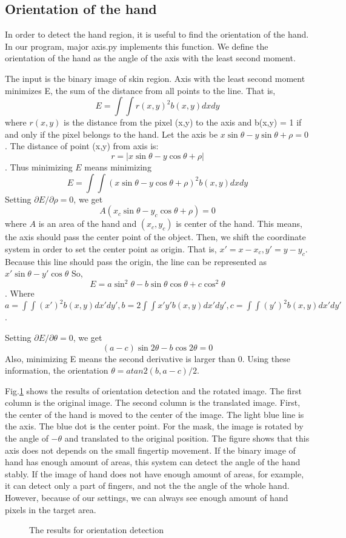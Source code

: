 \subsection{Orientation of the hand}
In order to detect the hand region, it is useful to find the orientation of the hand.
In our program, major axis.py implements this function.
We define the orientation of the hand as the angle of the axis with the least second moment.\par
The input is the binary image of skin region.
Axis with the least second moment minimizes E, the sum of the distance from all points to the line. That is,
$$E = \int \int r(x,y)^2 b(x,y) dxdy$$
where $r(x,y)$ is the distance from the pixel (x,y) to the axis and b(x,y) = 1 if and only if the pixel belongs to the hand.
Let the axis be $x\sin{\theta} - y\sin{\theta} + \rho = 0$.
The distance of point (x,y) from axis is:
$$r = |x\sin{\theta}-y\cos{\theta}+\rho|$$.
Thus minimizing $E$ means minimizing
$$E = \int\int (x\sin{\theta}-y\cos{\theta}+\rho)^2 b(x,y)dxdy$$
Setting $\partial E / \partial \rho = 0$, we get
$$A(x_c \sin{\theta} - y_c \cos{\theta} + \rho) = 0$$
where $A$ is an area of the hand and $(x_c,y_c)$ is center of the hand.
This means, the axis should pass the center point of the object.
Then, we shift the coordinate system in order to set the center point as origin.
That is, 
$x'= x - x_c, y' = y - y_c$.
Because this line should pass the origin, the line can be represented as
$x'\sin{\theta}-y'\cos{\theta}$
So, $$E = a \sin^2{\theta} - b\sin{\theta}\cos{\theta} + c\cos^2{\theta}$$.
Where $a = \int\int (x')^2 b(x,y) dx'dy', b = 2\int\int x'y' b(x,y) dx'dy', 
c = \int\int (y')^2 b(x,y)dx'dy'$.\par
Setting $\partial E / \partial \theta = 0$, we get
$$(a-c)\sin{2\theta} - b\cos{2\theta} = 0$$
Also, minimizing E means the second derivative is larger than 0.
Using these information, the orientation $\theta = atan2(b,a-c)/2$.\par
Fig.\ref{fig:mom2} shows the results of orientation detection and the rotated image.
The first column is the original image.
The second column is the translated image. First, the center of the hand is moved to the center of the image.
The light blue line is the axis. The blue dot is the center point.
For the mask, the image is rotated by the angle of $-\theta$ and translated to the original position.
The figure shows that this axis does not depends on the small fingertip movement.
If the binary image of hand has enough amount of areas, this system can detect the angle of the hand stably.
If the image of hand does not have enough amount of areas, for example, it can detect only a part of fingers,
and not the the angle of the whole hand.
However, because of our settings, we can always see enough amount of hand pixels in the target area.
\begin{figure}
 
 \caption{The results for orientation detection}
 \label{fig:mom2}
\end{figure}
